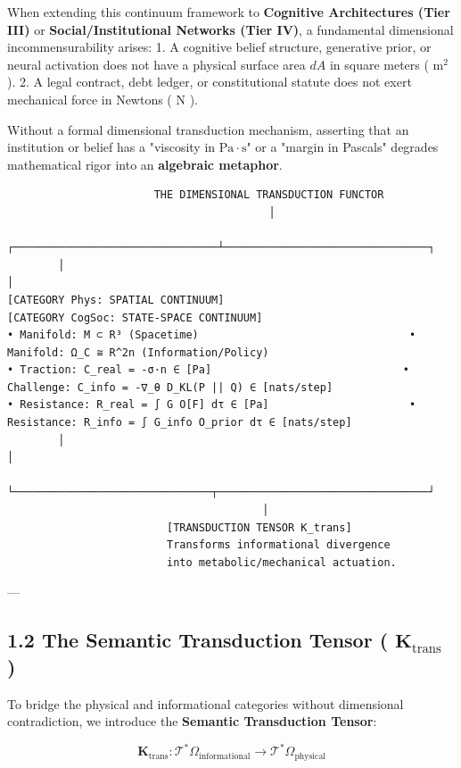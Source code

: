 \documentclass[11pt,a4paper]{article}
\theoremstyle{definition}
\theoremstyle{remark}
\begin{document}
When extending this continuum framework to \textbf{Cognitive Architectures (Tier III)} or \textbf{Social/Institutional Networks (Tier IV)}, a fundamental dimensional incommensurability arises:
1. A cognitive belief structure, generative prior, or neural activation does not have a physical surface area $dA$ in square meters ( $\mathrm{m^2}$ ).
2. A legal contract, debt ledger, or constitutional statute does not exert mechanical force in Newtons ( $\mathrm{N}$ ).

Without a formal dimensional transduction mechanism, asserting that an institution or belief has a "viscosity in $\mathrm{Pa \cdot s}$" or a "margin in Pascals" degrades mathematical rigor into an \textbf{algebraic metaphor}.

\begin{verbatim}
                       THE DIMENSIONAL TRANSDUCTION FUNCTOR
                                         │
        ┌────────────────────────────────┴────────────────────────────────┐
        │                                                                 │
[CATEGORY Phys: SPATIAL CONTINUUM]                             [CATEGORY CogSoc: STATE-SPACE CONTINUUM]
• Manifold: M ⊂ R³ (Spacetime)                                 • Manifold: Ω_C ≅ R^2n (Information/Policy)
• Traction: C_real = -σ·n ∈ [Pa]                              • Challenge: C_info = -∇_θ D_KL(P || Q) ∈ [nats/step]
• Resistance: R_real = ∫ G O[F] dτ ∈ [Pa]                      • Resistance: R_info = ∫ G_info O_prior dτ ∈ [nats/step]
        │                                                                 │
        └───────────────────────────────┬─────────────────────────────────┘
                                        │
                         [TRANSDUCTION TENSOR K_trans]
                         Transforms informational divergence
                         into metabolic/mechanical actuation.
\end{verbatim}

---

\subsection{1.2 The Semantic Transduction Tensor ( $\mathbf{K}_{\text{trans}}$ )}
To bridge the physical and informational categories without dimensional contradiction, we introduce the \textbf{Semantic Transduction Tensor}:


\begin{equation}
\mathbf{K}_{\text{trans}}: \mathcal{T}^*\Omega_{\text{informational}} \longrightarrow \mathcal{T}^*\Omega_{\text{physical}}
\end{equation}
\end{document}
